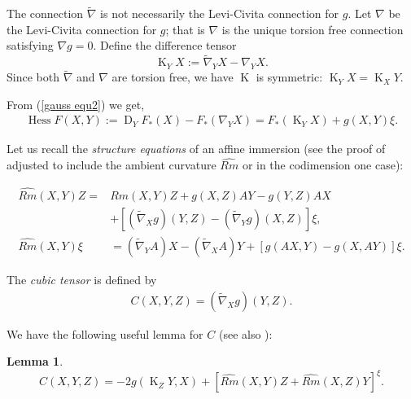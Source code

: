 \documentclass{amsart}
\newtheorem{lemma}[theorem]{Lemma}
\theoremstyle{definition}
\theoremstyle{remark}
\DeclareMathOperator{\hess}{Hess}
\DeclareMathOperator{\diff}{K}
\DeclareMathOperator{\D}{D}
\numberwithin{equation}{section}
\begin{document}
The connection $\tilde{\nabla}$ is not necessarily the Levi-Civita connection for $g$. Let $\nabla$ be the Levi-Civita connection for $g$; that is $\nabla$ is the unique torsion free connection satisfying $\nabla g=0.$ Define the difference tensor
\begin{equation}
\label{eq:difftensor}
\diff_YX := \tilde{\nabla}_{Y}X - \nabla_{Y}X.
\end{equation}
Since both $\tilde{\nabla}$ and $\nabla$ are torsion free, we have $\diff$ is symmetric: $\diff_YX = \diff_XY.$

From (\ref{gauss equ2}) we get,
\begin{align}\label{gauss equ3}
\hess F(X,Y):=\D_YF_{\ast}(X)-F_{\ast}(\nabla_YX) = F_{\ast}(\diff_YX) + g(X,Y)\xi.
\end{align}

Let us recall the \emph{structure equations} of an affine immersion (see the proof of \cite[Section II, Theorem 2.1]{MR1311248} adjusted to include the ambient curvature $\widehat{Rm}$ or \cite[p. 197 equations (N1.6)--(N1.9)]{MR1311248} in the codimension one case):

\begin{align}
\label{eq:structure1}
\widehat{Rm} (X, Y) Z =& Rm(X, Y) Z + g(X, Z) A Y - g(Y, Z)A X \\
&+ \left[(\tilde{\nabla}_X g) (Y, Z) - (\tilde{\nabla}_Y g)( X, Z)\right] \xi \nonumber,\\
\label{eq:structure2}
\widehat{Rm} (X, Y) \xi &= (\tilde{\nabla}_Y A) X - (\tilde{\nabla}_X A) Y + \left[g(AX, Y) - g(X, AY)\right]\xi.
\end{align}

The \emph{cubic tensor} is defined by
\begin{align}
C(X,Y,Z) = (\tilde{\nabla}_X g) (Y,Z).
\end{align}

We have the following useful lemma for $C$ (see also \cite[Section II, Proposition 4.1]{MR1311248}):

\begin{lemma}
\[
C(X, Y, Z) =  -2g(\diff_Z Y, X) + \left[\widehat{Rm}(X, Y)Z + \widehat{Rm}(X, Z)Y\right]^{\xi}.
\]
\end{lemma}
\end{document}
